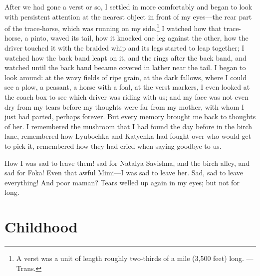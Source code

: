 After we had gone a verst or so, I settled in more comfortably and began to look with persistent attention at the nearest object in front of my eyes---the rear part of the trace-horse, which was running on my side.\footnote{A verst was a unit of length roughly two-thirds of a mile (3,500 feet) long. ---Trans.} I watched how that trace-horse, a pinto, waved its tail, how it knocked one leg against the other, how the driver touched it with the braided whip and its legs started to leap together; I watched how the back band leapt on it, and the rings after the back band, and watched until the back band became covered in lather near the tail. I began to look around: at the wavy fields of ripe grain, at the dark fallows, where I could see a plow, a peasant, a horse with a foal, at the verst markers, I even looked at the coach box to see which driver was riding with us; and my face was not even dry from my tears before my thoughts were far from my mother, with whom I just had parted, perhaps forever. But every memory brought me back to thoughts of her. I remembered the mushroom that I had found the day before in the birch lane, remembered how Lyubochka and Katyenka had fought over who would get to pick it, remembered how they had cried when saying goodbye to us.

How I was sad to leave them! sad for Natalya Savishna, and the birch alley, and sad for Foka! Even that awful Mimi---I was sad to leave her. Sad, sad to leave everything! And poor maman? Tears welled up again in my eyes; but not for long.

\chapter{Childhood}
